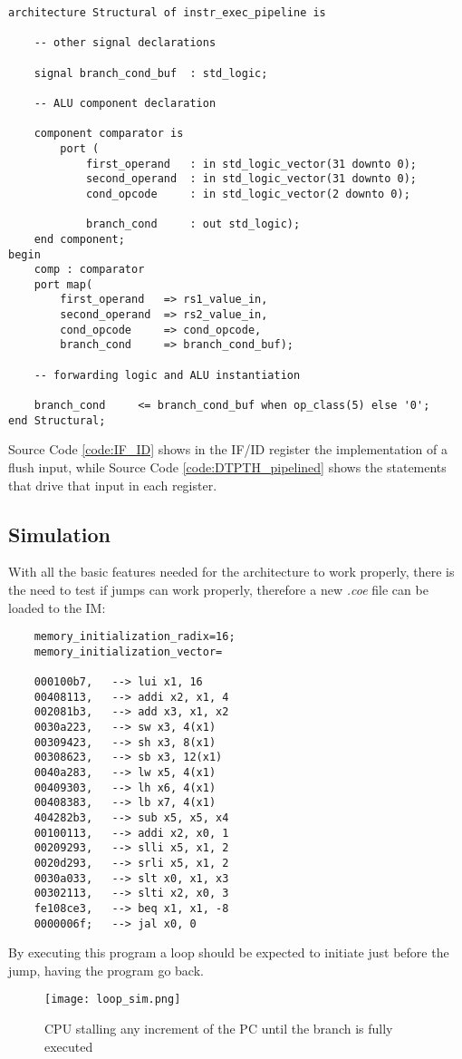 \begin{verbatim}
architecture Structural of instr_exec_pipeline is
    
    -- other signal declarations

    signal branch_cond_buf  : std_logic;

    -- ALU component declaration
    
    component comparator is
        port ( 
            first_operand   : in std_logic_vector(31 downto 0);
            second_operand  : in std_logic_vector(31 downto 0);
            cond_opcode     : in std_logic_vector(2 downto 0);
            
            branch_cond     : out std_logic);
    end component;
begin
    comp : comparator 
    port map(
        first_operand   => rs1_value_in,
        second_operand  => rs2_value_in,
        cond_opcode     => cond_opcode,
        branch_cond     => branch_cond_buf); 
    
    -- forwarding logic and ALU instantiation
    
    branch_cond     <= branch_cond_buf when op_class(5) else '0';
end Structural;
\end{verbatim}

Source Code \ref{code:IF_ID} shows in the IF/ID register the implementation of a flush input, while Source Code \ref{code:DTPTH_pipelined} shows the statements that drive that input in each register.

\subsection{Simulation}
With all the basic features needed for the architecture to work properly, there is the need to test if jumps can work properly, therefore a new \emph{.coe} file can be loaded to the IM:

\begin{verbatim}
    memory_initialization_radix=16;
    memory_initialization_vector=

    000100b7,   --> lui x1, 16
    00408113,   --> addi x2, x1, 4
    002081b3,   --> add x3, x1, x2
    0030a223,   --> sw x3, 4(x1)
    00309423,   --> sh x3, 8(x1)
    00308623,   --> sb x3, 12(x1)
    0040a283,   --> lw x5, 4(x1)
    00409303,   --> lh x6, 4(x1) 
    00408383,   --> lb x7, 4(x1)
    404282b3,   --> sub x5, x5, x4
    00100113,   --> addi x2, x0, 1
    00209293,   --> slli x5, x1, 2
    0020d293,   --> srli x5, x1, 2
    0030a033,   --> slt x0, x1, x3
    00302113,   --> slti x2, x0, 3
    fe108ce3,   --> beq x1, x1, -8      
    0000006f;   --> jal x0, 0           
\end{verbatim}

By executing this program a loop should be expected to initiate just before the jump, having the program go back. 

\begin{figure}[!ht]
    \centering
    \texttt{[image: loop\_sim.png]}
    \caption{CPU stalling any increment of the PC until the branch is fully executed}
    \label{fig:loop_sim}
\end{figure}
